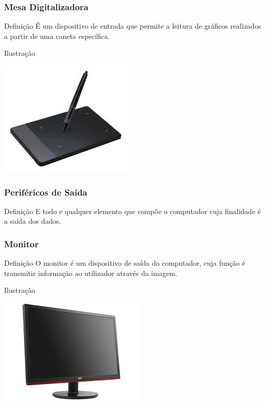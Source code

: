 \documentclass[aspectratio=169]{beamer} %
\begin{document}
\begin{frame}
	\frametitle{Mesa Digitalizadora}
	
	\begin{block}{Defini\c cão}
		É um dispositivo de entrada que permite a leitura de gráficos realizados a partir de uma caneta específica.
	\end{block}\vfill
	
	\begin{exampleblock}{Ilustra\c cão}
		\begin{center}
			\includegraphics[scale=0.5]{img/mesa_digitalizadora}
		\end{center}		
	\end{exampleblock}
\end{frame}


\begin{frame}
	\frametitle{Periféricos de Saída}
	
	\begin{block}{Defini\c cão}
		E todo e qualquer elemento que compõe o computador cuja finalidade é a saída dos dados.
	\end{block}
\end{frame}

\begin{frame}
	\frametitle{Monitor}
	
	\begin{block}{Defini\c cão}
		O monitor é um dispositivo de saída do computador, cuja função é transmitir informação ao utilizador através da imagem.
	\end{block}\vfill
	
	\begin{exampleblock}{Ilustra\c cão}
		\begin{center}
			\includegraphics[scale=0.4]{img/monitor}
		\end{center}		
	\end{exampleblock}
\end{frame}
\end{document}
